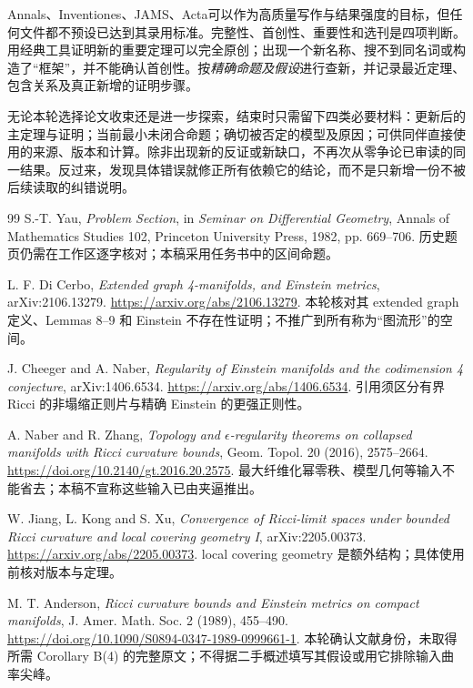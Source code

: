 \documentclass[UTF8,a4paper,11pt,fontset=fandol]{ctexart}
\numberwithin{equation}{section}
\theoremstyle{definition}
\begin{document}
Annals、Inventiones、JAMS、Acta可以作为高质量写作与结果强度的目标，但任何文件都不预设已达到其录用标准。完整性、首创性、重要性和选刊是四项判断。用经典工具证明新的重要定理可以完全原创；出现一个新名称、搜不到同名词或构造了“框架”，并不能确认首创性。按\emph{精确命题及假设}进行查新，并记录最近定理、包含关系及真正新增的证明步骤。

无论本轮选择论文收束还是进一步探索，结束时只需留下四类必要材料：更新后的主定理与证明；当前最小未闭合命题；确切被否定的模型及原因；可供同伴直接使用的来源、版本和计算。除非出现新的反证或新缺口，不再次从零争论已审读的同一结果。反过来，发现具体错误就修正所有依赖它的结论，而不是只新增一份不被后续读取的纠错说明。

\begin{thebibliography}{99}
 S.-T. Yau, \emph{Problem Section}, in \emph{Seminar on Differential Geometry}, Annals of Mathematics Studies 102, Princeton University Press, 1982, pp. 669--706. 历史题页仍需在工作区逐字核对；本稿采用任务书中的区间命题。

 L. F. Di Cerbo, \emph{Extended graph 4-manifolds, and Einstein metrics}, arXiv:2106.13279. \url{https://arxiv.org/abs/2106.13279}. 本轮核对其 extended graph 定义、Lemmas 8--9 和 Einstein 不存在性证明；不推广到所有称为“图流形”的空间。

 J. Cheeger and A. Naber, \emph{Regularity of Einstein manifolds and the codimension 4 conjecture}, arXiv:1406.6534. \url{https://arxiv.org/abs/1406.6534}. 引用须区分有界 Ricci 的非塌缩正则片与精确 Einstein 的更强正则性。

 A. Naber and R. Zhang, \emph{Topology and $\epsilon$-regularity theorems on collapsed manifolds with Ricci curvature bounds}, Geom. Topol. 20 (2016), 2575--2664. \url{https://doi.org/10.2140/gt.2016.20.2575}. 最大纤维化幂零秩、模型几何等输入不能省去；本稿不宣称这些输入已由夹逼推出。

 W. Jiang, L. Kong and S. Xu, \emph{Convergence of Ricci-limit spaces under bounded Ricci curvature and local covering geometry I}, arXiv:2205.00373. \url{https://arxiv.org/abs/2205.00373}. local covering geometry 是额外结构；具体使用前核对版本与定理。

 M. T. Anderson, \emph{Ricci curvature bounds and Einstein metrics on compact manifolds}, J. Amer. Math. Soc. 2 (1989), 455--490. \url{https://doi.org/10.1090/S0894-0347-1989-0999661-1}. 本轮确认文献身份，未取得所需 Corollary B(4) 的完整原文；不得据二手概述填写其假设或用它排除输入曲率尖峰。


\end{thebibliography}
\end{document}
